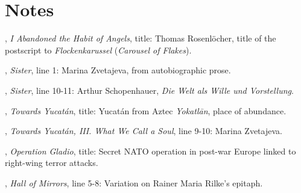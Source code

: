 
\chapter{Notes}

\thispagestyle{normalpage}
\normalsize

{\setlength{\parindent}{0pt}
\setlength{\parskip}{\onelineskip}

, \textit{I Abandoned the Habit of Angels}, title: Thomas Rosenlöcher, title of the postscript to \textit{Flockenkarussel} (\textit{Carousel of Flakes}).

, \textit{Sister}, line 1: Marina Zvetajeva, from autobiographic prose.

, \textit{Sister}, line 10-11: Arthur Schopenhauer, \textit{Die Welt als Wille und Vorstellung}.

, \textit{Towards Yucatán}, title: Yucatán from Aztec \textit{Yokatlān}, place of abundance.

, \textit{Towards Yucatán, III. What We Call a Soul}, line 9-10: Marina Zvetajeva.

, \textit{Operation Gladio}, title: Secret NATO operation in post-war Europe linked to right-wing terror attacks.

, \textit{Hall of Mirrors}, line 5-8: Variation on Rainer Maria Rilke's epitaph.

}

